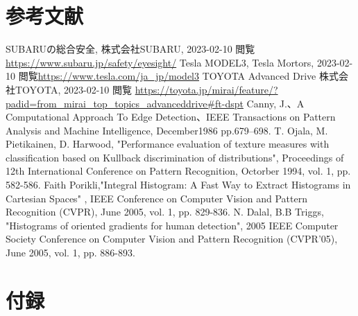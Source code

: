 \documentclass[titlepage,dvipdfmx]{jsarticle}
\begin{document}
\section{参考文献}
\begin{thebibliography}{99}
   SUBARUの総合安全, 株式会社SUBARU, 2023-02-10 閲覧\url{https://www.subaru.jp/safety/eyesight/}
   Tesla MODEL3, Tesla Mortors, 2023-02-10 閲覧\url{https://www.tesla.com/ja_jp/model3}
   TOYOTA Advanced Drive 株式会社TOYOTA, 2023-02-10 閲覧 \url{https://toyota.jp/mirai/feature/?padid=from_mirai_top_topics_advanceddrive#ft-dspt}
   Canny, J.、A Computational Approach To Edge Detection、IEEE Transactions on Pattern Analysis and Machine Intelligence, December1986 pp.679–698.
   T. Ojala, M. Pietikainen, D. Harwood, "Performance evaluation of texture measures with classification based on Kullback discrimination of distributions", Proceedings of 12th International Conference on Pattern Recognition, Octorber 1994, vol. 1, pp. 582-586.
   Faith Porikli,"Integral Histogram: A Fast Way to Extract Histograms in Cartesian Spaces" , IEEE Conference on Computer Vision and Pattern Recognition (CVPR), June 2005, vol. 1, pp. 829-836.
   N. Dalal, B.B Triggs, "Histograms of oriented gradients for human detection", 2005 IEEE Computer Society Conference on Computer Vision and Pattern Recognition (CVPR'05), June 2005, vol. 1, pp. 886-893.
\end{thebibliography}
\section{付録}
\end{document}
